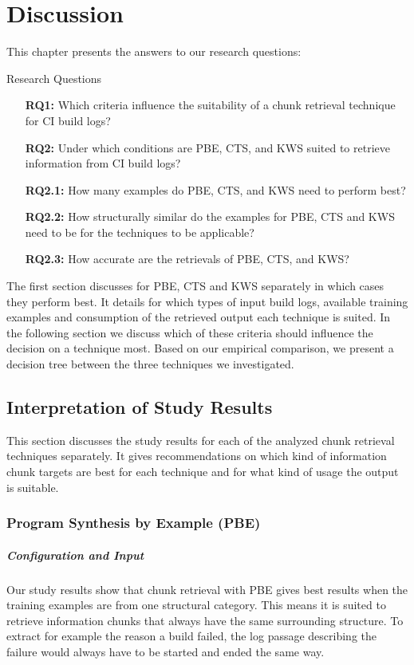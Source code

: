 \documentclass[\myrootdir/main.tex]{subfiles}
\begin{document}
\chapter{Discussion}
\label{sec:discussion}

This chapter presents the answers to our research questions:
\begin{simplebox}{Research Questions}
\begin{itemize}
  \item[\textbf{RQ1:}] Which criteria influence the suitability of a chunk retrieval technique for CI build logs?
  \item[\textbf{RQ2:}] Under which conditions are PBE, CTS, and KWS suited to retrieve information from CI build logs?
  \item[\textbf{RQ2.1:}] How many examples do PBE, CTS, and KWS need to perform best?
  \item[\textbf{RQ2.2:}] How structurally similar do the examples for PBE, CTS and KWS need to be for the techniques to be applicable?
  \item[\textbf{RQ2.3:}] How accurate are the retrievals of PBE, CTS, and KWS?
\end{itemize}
\end{simplebox}

The first section discusses for PBE, CTS and KWS separately in which cases they perform best.
It details for which types of input build logs, available training examples and consumption of the retrieved output each technique is suited.
In the following section we discuss which of these criteria should influence the decision on a technique most.
Based on our empirical comparison, we present a decision tree between the three techniques we investigated.

\section{Interpretation of Study Results}
This section discusses the study results for each of the analyzed chunk retrieval techniques separately.
It gives recommendations on which kind of information chunk targets are best for each technique and for what kind of usage the output is suitable.

\subsection{Program Synthesis by Example (PBE)}
\paragraph{Configuration and Input}
Our study results show that chunk retrieval with PBE gives best results when the training examples are from one structural category.
This means it is suited to retrieve information chunks that always have the same surrounding structure.
To extract for example the reason a build failed, the log passage describing the failure would always have to be started and ended the same way.
\end{document}

